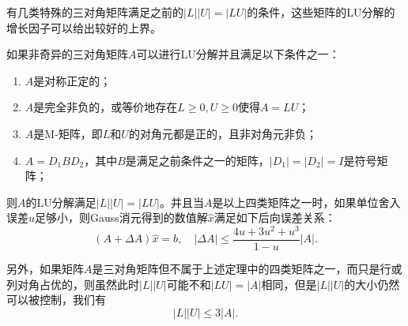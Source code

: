 \documentclass[a4paper,10pt]{ctexart}
\begin{document}
有几类特殊的三对角矩阵满足之前的$ |L| |U| = |LU| $的条件，这些矩阵的LU分解的增长因子可以给出较好的上界。
\begin{theorem}
    如果非奇异的三对角矩阵$ A $可以进行LU分解并且满足以下条件之一：
    \begin{enumerate}
        \item $ A $是对称正定的；
        \item $ A $是完全非负的，或等价地存在$ L\geqslant 0,U\geqslant 0 $使得$ A=LU $；
        \item $ A $是M-矩阵，即$ L $和$ U $的对角元都是正的，且非对角元非负；
        \item $ A = D_1BD_2 $，其中$ B $是满足之前条件之一的矩阵，$ |D_1|=|D_2|=I $是符号矩阵；
    \end{enumerate}
    则$ A $的LU分解满足$ |L| |U| = |LU| $。并且当$ A $是以上四类矩阵之一时，如果单位舍入误差$ u $足够小，则Gauss消元得到的数值解$ \hat{x} $满足如下后向误差关系：
    \begin{equation}
        (A+\Delta A)\hat{x} = b,\quad |\Delta A| \leqslant \frac{4u+3u^2+u^3}{1-u}|A|.
    \end{equation}
\end{theorem}

另外，如果矩阵$ A $是三对角矩阵但不属于上述定理中的四类矩阵之一，而只是行或列对角占优的，则虽然此时$ |L| |U| $可能不和$ |LU|=|A| $相同，但是$ |L| |U| $的大小仍然可以被控制，我们有
\[
    |L| |U| \leqslant 3|A|.
\]
\end{document}
